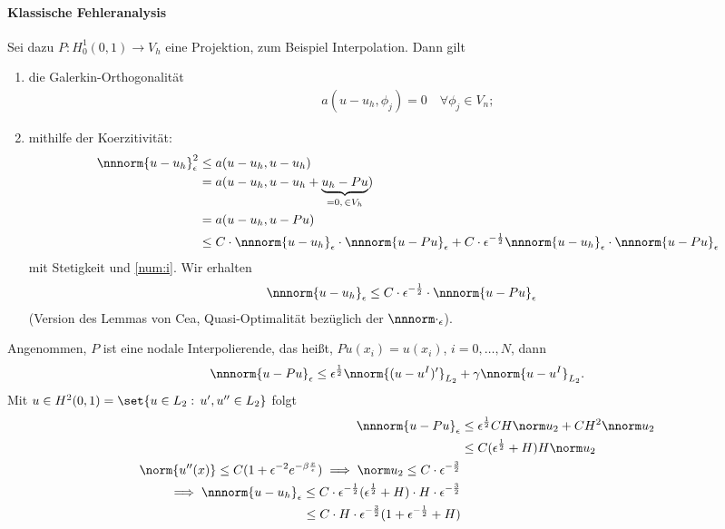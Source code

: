 \paragraph{Klassische Fehleranalysis}
Sei dazu $P: H_{0}^{1}(0, 1) \to V_{h}$ eine Projektion, zum Beispiel Interpolation. Dann gilt
\begin{enumerate}
\item \label{num:i} die Galerkin-Orthogonalität
  \begin{align*}
    a(u - u_{h}, \phi_{j}) = 0 \quad \forall \phi_{j}\in V_{n};
  \end{align*}
\item \label{num:ii}mithilfe der Koerzitivität:
  \begin{align*}
    \nnnorm{u-u_{h}}_{\epsilon}^{2} &\leq a(u-u_{h}, u- u_{h})\\
    &= a(u-u_{h}, u-u_{h}+ \underbrace{u_{h} - Pu}_{= 0, \, \in V_{h}})\\
    &= a(u-u_{h}, u- Pu)\\
    &\leq C\cdot \nnnorm{u-u_{h}}_{\epsilon} \cdot\nnnorm{u-Pu}_{\epsilon} + C\cdot \epsilon^{-\frac 12} \nnnorm{u-u_{h}}_{\epsilon}\cdot\nnnorm{u-Pu}_{\epsilon}
  \end{align*}
  mit Stetigkeit und \ref{num:i}. Wir erhalten
  \begin{align*}
    \nnnorm{u-u_{h}}_{\epsilon} &\leq  C\cdot \epsilon^{-\frac 12} \cdot \nnnorm{u-Pu}_{\epsilon}
  \end{align*}
  (Version des Lemmas von Cea, Quasi-Optimalität bezüglich der $\nnnorm\cdot_{\epsilon}$). 
\end{enumerate}
Angenommen, $P$ ist eine nodale Interpolierende, das heißt, $Pu(x_{i}) = u(x_{i})$, $i = 0, \dots, N$, dann
\begin{align*}
  \nnnorm{u-Pu}_{\epsilon} \leq \epsilon^{\frac 12}\nnorm{(u-u^{I})'}_{L_{2}} + \gamma \nnorm{u-u^{I}}_{L_{2}}. 
\end{align*}
Mit $u \in H^{2}(0, 1) = \set{u \in L_{2}: \,  u', u'' \in L_{2}}$ folgt
\begin{align*}
  \nnnorm{u - Pu}_{\epsilon} &\leq \epsilon^{\frac 12} C H\norm u_{2} + CH^{2} \nnorm u_{2}\\
  &\leq C(\epsilon^{\frac 12} + H) H\norm u_{2} \\
  \norm{u''(x)}\leq C(1 + \epsilon^{-2}e^{- \beta \frac x \epsilon}) \implies \norm u_{2} \leq C\cdot\epsilon^{- \frac 32}\\
  \implies \nnnorm{u-u_{h}}_{\epsilon} \leq C \cdot \epsilon^{- \frac 12}(\epsilon^{\frac 12} + H)\cdot H\cdot \epsilon^{- \frac 32}\\
  \leq C \cdot H\cdot \epsilon^{- \frac 32}(1 + \epsilon^{-\frac 12} + H)
\end{align*}
